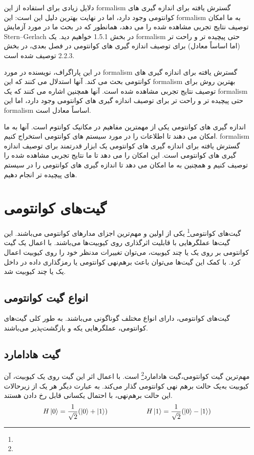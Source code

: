 \documentclass{book}
\begin{document}
دلایل زیادی برای استفاده از این formalism گسترش یافته برای اندازه گیری های کوانتومی وجود دارد، اما در نهایت بهترین دلیل این است: این formalism به ما امکان توصیف نتایج تجربی مشاهده شده را می دهد، همانطور که در بحث ما در مورد آزمایش Stern–Gerlach در بخش 1.5.1 خواهیم دید. یک formalism حتی پیچیده تر و راحت تر (اما اساساً معادل) برای توصیف اندازه گیری های کوانتومی در فصل بعدی، در بخش 2.2.3 توصیف شده است.

در این پاراگراف، نویسنده در مورد formalism گسترش یافته برای اندازه گیری های کوانتومی بحث می کند. آنها استدلال می کنند که این formalism بهترین روش برای توصیف نتایج تجربی مشاهده شده است. آنها همچنین اشاره می کنند که یک formalism حتی پیچیده تر و راحت تر برای توصیف اندازه گیری های کوانتومی وجود دارد، اما این formalism اساساً معادل است.

اندازه گیری های کوانتومی یکی از مهمترین مفاهیم در مکانیک کوانتوم است. آنها به ما امکان می دهند تا اطلاعات را در مورد سیستم های کوانتومی استخراج کنیم. formalism گسترش یافته برای اندازه گیری های کوانتومی یک ابزار قدرتمند برای توصیف اندازه گیری های کوانتومی است. این امکان را می دهد تا ما نتایج تجربی مشاهده شده را توصیف کنیم و همچنین به ما امکان می دهد تا اندازه گیری های کوانتومی را در سیستم های پیچیده تر انجام دهیم. 



\newpage
\section{گیت‌های کوانتومی}
گیت‌های کوانتومی\footnote{} یکی از اولین و مهم‌ترین اجزای‌ مدار‌های کوانتومی ‌می‌باشند. این گیت‌ها عملگر‌هایی با قابلیت اثر‌گذاری روی کیوبیت‌ها می‌باشند. با اعمال یک گیت کوانتومی بر روی یک یا چند کیوبیت، می‌توان تغییرات مدنظر خود را روی کیوبیت اعمال کرد. با کمک این گیت‌ها می‌توان باعث برهم‌نهی کوانتومی یا رمز‌گذاری داده در داخل یک یا چند کیوبیت شد.

\subsection{انواع گیت کوانتومی}
گیت‌های کوانتومی، دارای انواع مختلف گوناگونی می‌باشند. به طور کلی گیت‌های کوانتومی، عملگر‌هایی یکه و بازگشت‌پذیر می‌باشند. 
\subsection*{گیت هادامارد}
مهم‌ترین گیت کوانتومی،‌گیت هادامارد\footnote{} است. با اعمال اثر این گیت روی یک کیوبیت، آن کیوبیت به‌یک حالت برهم نهی‌ کوانتومی‌ گذار‌ می‌کند. به عبارت دیگر هر یک از زیرحالات این حالت برهم‌نهی، با احتمال یکسانی قابل رخ دادن‌ هستند. 
\vspace{1cm}
$$
H\ket{0} = \frac{1}{\sqrt{2}} (\ket{0} + \ket{1})
\hspace{2cm}
H\ket{1} = \frac{1}{\sqrt{2}} (\ket{0} - \ket{1})
$$
\vspace{1cm}
\end{document}
